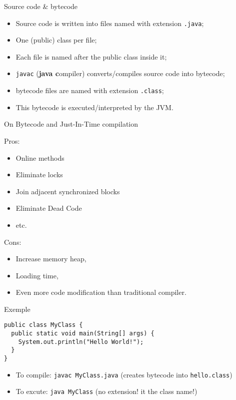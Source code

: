\documentclass[English,c,%
hyperref={%
    pdftitle={FISA-DE2 OOP in Java},%
    pdfauthor={Muller, Gravier, Laforest, Subercaze},%
    pdfsubject={OOP in Java},%
    pdfkeywords={OOP, Java}%
    },%
xcolor={pdftex,svgnames} %
]{beamer}
\begin{document}
\begin{frame}{Source code \& bytecode}
\begin{itemize}
    \item Source code is written into files named with extension \texttt{.java};
    \item One (public) class per file;
    \item Each file is named after the public class inside it;
    \item \texttt{javac} (\textbf{java c}ompiler) converts/compiles source code into bytecode;
    \item bytecode files are named with extension \texttt{.class};
    \item This bytecode is executed/interpreted by the JVM.
\end{itemize}
\end{frame}

\begin{frame}{On Bytecode and Just-In-Time compilation}

Pros:
\begin{itemize}
    \item Online methods
    \item Eliminate locks
    \item Join adjacent synchronized blocks
    \item Eliminate Dead Code
    \item etc.
\end{itemize}

\pause

Cons:
\begin{itemize}
    \item Increase memory heap,
    \item Loading time,
    \item Even more code modification than traditional compiler.
\end{itemize}

\end{frame}

\begin{frame}[fragile]{Exemple}
\begin{lstlisting}[escapechar=\%,label=hellojava,caption=MyClass.java]
public class MyClass {
  public static void main(String[] args) {
    System.out.println("Hello World!");
  }
}
\end{lstlisting}

\bigskip

\begin{itemize}
    \item To compile: \texttt{javac MyClass.java} (creates bytecode into \texttt{hello.class})
    \item To excute: \texttt{java MyClass} (no extension! it the class name!)
\end{itemize}

\end{frame}
\end{document}
